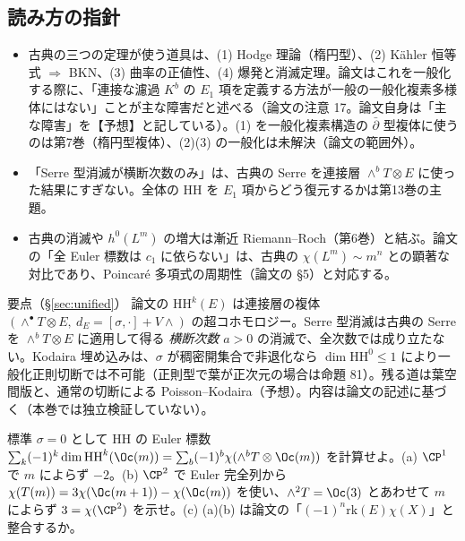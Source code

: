 \subsection{読み方の指針}
\begin{itemize}
\item 古典の三つの定理が使う道具は、(1) Hodge 理論（楕円型）、(2) Kähler 恒等式 $\Rightarrow$ BKN、(3) 曲率の正値性、(4) 爆発と消滅定理。論文はこれを一般化する際に、「連接な濾過 $K^b$ の $E_1$ 項を定義する方法が一般の一般化複素多様体にはない」ことが主な障害だと述べる（論文の注意 17。論文自身は「主な障害」を【予想】と記している）。(1) を一般化複素構造の $\bar\partial$ 型複体に使うのは第7巻（楕円型複体）、(2)(3) の一般化は未解決（論文の範囲外）。
\item 「Serre 型消滅が横断次数のみ」は、古典の Serre を連接層 $\wedge^bT\otimes E$ に使った結果にすぎない。全体の $\mathrm{HH}$ を $E_1$ 項からどう復元するかは第13巻の主題。
\item 古典の消滅や $h^0(L^m)$ の増大は漸近 Riemann--Roch（第6巻）と結ぶ。論文の「全 Euler 標数は $c_1$ に依らない」は、古典の $\chi(L^m)\sim m^n$ との顕著な対比であり、Poincaré 多項式の周期性（論文の \S5）と対応する。
\end{itemize}

\begin{keybox}{要点（\S\ref{sec:unified}）}
論文の $\mathrm{HH}^k(E)$ は連接層の複体 $(\wedge^\bullet T\otimes E,\ d_E=[\sigma,\cdot]+V\wedge)$ の超コホモロジー。Serre 型消滅は古典の Serre を $\wedge^bT\otimes E$ に適用して得る \emph{横断次数 $a>0$} の消滅で、全次数では成り立たない。Kodaira 埋め込みは、$\sigma$ が稠密開集合で非退化なら $\dim\mathrm{HH}^0\le1$ により一般化正則切断では不可能（正則型で葉が正次元の場合は命題 81）。残る道は葉空間版と、通常の切断による Poisson--Kodaira（予想）。内容は論文の記述に基づく（本巻では独立検証していない\tQ）。
\end{keybox}

\begin{prob}{標準}\label{p:unifiedP1}
$\sigma=0$ として $\mathrm{HH}$ の Euler 標数 $\sum_k(-1)^k\dim\mathrm{HH}^k(\Oc(m))=\sum_b(-1)^b\chi(\wedge^bT\otimes\Oc(m))$ を計算せよ。(a) $\CP^1$ で $m$ によらず $-2$。(b) $\CP^2$ で Euler 完全列から $\chi(T(m))=3\chi(\Oc(m+1))-\chi(\Oc(m))$ を使い、$\wedge^2T=\Oc(3)$ とあわせて $m$ によらず $3=\chi(\CP^2)$ を示せ。(c) (a)(b) は論文の「$(-1)^n\mathrm{rk}(E)\chi(X)$」と整合するか。
\end{prob}

